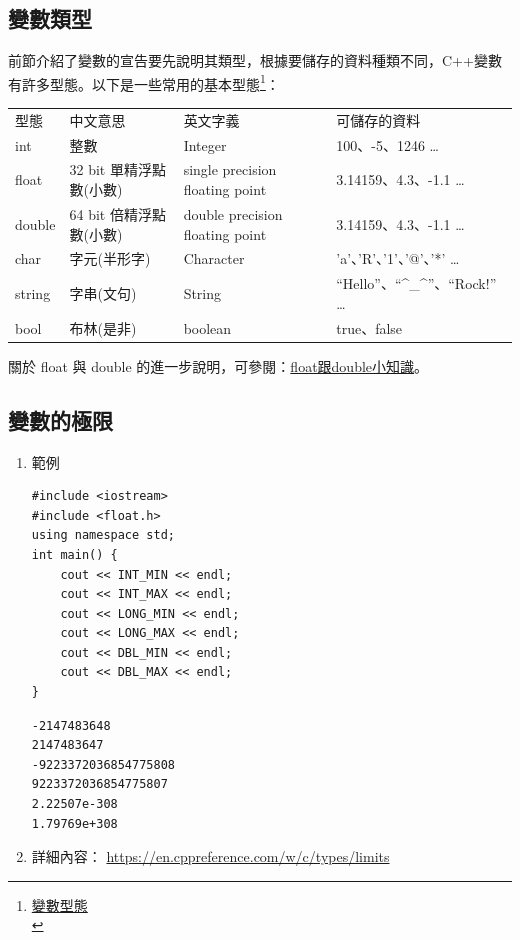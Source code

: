 \documentclass[a4paper,12pt]{article}
\begin{document}
\subsection{變數類型}
\label{cpp_variable_types}
前節介紹了變數的宣告要先說明其類型，根據要儲存的資料種類不同，C++變數有許多型態。以下是一些常用的基本型態\footnote{\href{https://www.csie.ntu.edu.tw/\~b98902112/cpp\_and\_algo/cpp/variable\_type\_and\_declare.html}{變數型態}\\}：\\
\begin{center}
\begin{tabular}{llll}
型態 & 中文意思 & 英文字義 & 可儲存的資料\\
int & 整數 & Integer & 100、-5、1246 \ldots{}\\
float & 32 bit 單精浮點數(小數) & single precision floating point & 3.14159、4.3、-1.1 \ldots{}\\
double & 64 bit 倍精浮點數(小數) & double precision floating point & 3.14159、4.3、-1.1 \ldots{}\\
char & 字元(半形字) & Character & 'a'、'R'、'1'、'@'、'*' \ldots{}\\
string & 字串(文句) & String & ``Hello''、``\^{}\_\^{}''、``Rock!'' \ldots{}\\
bool & 布林(是非) & boolean & true、false\\
\end{tabular}
\end{center}
關於 float 與 double 的進一步說明，可參閱：\href{https://taichunmin.pixnet.net/blog/post/27827769}{float跟double小知識}。\\

\subsection{變數的極限}
\label{sec:orgd33a2b8}
\begin{enumerate}
\item 範例
\label{sec:orgd91b97d}
\lstset{breaklines=true,language=cpp,label= ,caption= ,captionpos=b,firstnumber=1,numbers=left}
\begin{lstlisting}
#include <iostream>
#include <float.h>
using namespace std;
int main() {
    cout << INT_MIN << endl;
    cout << INT_MAX << endl;
    cout << LONG_MIN << endl;
    cout << LONG_MAX << endl;
    cout << DBL_MIN << endl;
    cout << DBL_MAX << endl;
}
\end{lstlisting}

\begin{verbatim}
-2147483648
2147483647
-9223372036854775808
9223372036854775807
2.22507e-308
1.79769e+308
\end{verbatim}

\item 詳細內容：
\label{sec:org7258fc3}
\url{https://en.cppreference.com/w/c/types/limits}\\
\end{enumerate}
\end{document}
